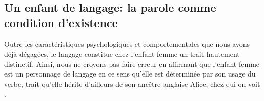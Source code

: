 \subsection{Un enfant de langage: la parole comme condition d'existence}
Outre les caractéristiques psychologiques et comportementales que nous avons déjà dégagées, le langage constitue chez l'enfant-femme un trait hautement distinctif.
Ainsi, nous ne croyons pas faire erreur en affirmant que l'enfant-femme est un personnage de langage en ce sens qu'elle est déterminée par son usage du verbe, trait qu'elle hérite d'ailleurs de son ancêtre anglaise Alice, chez qui on voit .

